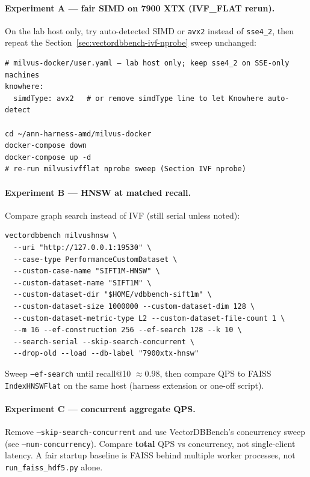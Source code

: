 \documentclass[11pt,a4paper]{article}
\begin{document}
\paragraph{Experiment A --- fair SIMD on 7900 XTX (IVF\_FLAT rerun).}
On the lab host only, try auto-detected SIMD or \texttt{avx2} instead of \texttt{sse4\_2},
then repeat the Section~\ref{sec:vectordbbench-ivf-nprobe} sweep unchanged:

\begin{verbatim}
# milvus-docker/user.yaml — lab host only; keep sse4_2 on SSE-only machines
knowhere:
  simdType: avx2   # or remove simdType line to let Knowhere auto-detect

cd ~/ann-harness-amd/milvus-docker
docker-compose down
docker-compose up -d
# re-run milvusivfflat nprobe sweep (Section IVF nprobe)
\end{verbatim}

\paragraph{Experiment B --- HNSW at matched recall.}
Compare graph search instead of IVF (still serial unless noted):

\begin{verbatim}
vectordbbench milvushnsw \
  --uri "http://127.0.0.1:19530" \
  --case-type PerformanceCustomDataset \
  --custom-case-name "SIFT1M-HNSW" \
  --custom-dataset-name "SIFT1M" \
  --custom-dataset-dir "$HOME/vdbbench-sift1m" \
  --custom-dataset-size 1000000 --custom-dataset-dim 128 \
  --custom-dataset-metric-type L2 --custom-dataset-file-count 1 \
  --m 16 --ef-construction 256 --ef-search 128 --k 10 \
  --search-serial --skip-search-concurrent \
  --drop-old --load --db-label "7900xtx-hnsw"
\end{verbatim}

Sweep \texttt{--ef-search} until recall@10 $\approx 0.98$, then compare QPS to FAISS
\texttt{IndexHNSWFlat} on the same host (harness extension or one-off script).

\paragraph{Experiment C --- concurrent aggregate QPS.}
Remove \texttt{--skip-search-concurrent} and use VectorDBBench's concurrency sweep (see
\texttt{--num-concurrency}). Compare \textbf{total} QPS vs concurrency, not single-client
latency. A fair startup baseline is FAISS behind multiple worker processes, not
\texttt{run\_faiss\_hdf5.py} alone.
\end{document}
